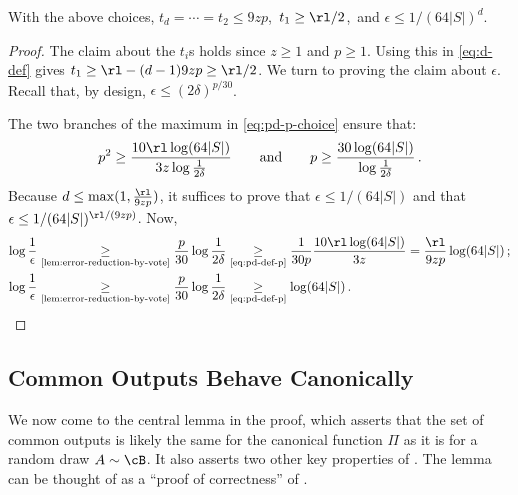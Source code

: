 \begin{itemize}
\begin{itemize}
\begin{lemma}\label{lem:pd-p-properties}
  With the above choices, $t_d = \cdots = t_2 \le 9zp$,\, $t_1 \ge \rl / 2$,\, and
  $\epsilon \le 1 / (64 |S|)^d$.
\end{lemma}
%
\begin{proof}%
  The claim about the $t_i$s holds since $z \ge 1$ and $p \ge 1$. Using this
  in \cref{eq:d-def} gives $t_1 \ge \rl - (d - 1) 9zp \ge \rl / 2$. We turn to
  proving the claim about $\epsilon$. Recall that, by design, $\epsilon \le
  (2\delta)^{p/30}$. 

  The two branches of the maximum in \cref{eq:pd-p-choice} ensure that:
  \begin{align}
    p^2 \ge \frac{10 \rl \log (64|S|)}{3 z \log \frac{1}{2\delta}} \qquad \text{and} \qquad p \ge \frac{30 \log(64|S|)}{\log \frac{1}{2\delta}}\,. \label{eq:pd-def-p}
  \end{align}
  Because $d \le \max(1, \frac{\rl}{9 z p})$, it suffices to prove that
  $\epsilon \le 1 / (64 |S|)$ and that $\epsilon \le 1 / (64 |S|)^{\rl / (9 z
  p)}$. Now,
  \begin{align*}
    \log \frac{1}{\epsilon}
    &\underset{\text{\Cref{lem:error-reduction-by-vote}}}{\ge} \frac{p}{30}
      \log \frac{1}{2\delta} \underset{\text{\cref{eq:pd-def-p}}}{\ge}
      \frac{1}{30 p} \frac{10 \rl \log(64 |S|)}{3z} = \frac{\rl}{9zp}
      \log(64|S|) \,; \\ 
    \log \frac{1}{\epsilon} 
    &\underset{\text{\Cref{lem:error-reduction-by-vote}}}{\ge} \frac{p}{30} 
      \log \frac{1}{2\delta} \underset{\text{\cref{eq:pd-def-p}}}{\ge} \log(64|S|) \,. \qedhere
  \end{align*}
\end{proof}


\subsection{Common Outputs Behave Canonically}

We now come to the central lemma in the proof, which asserts that the set of
common outputs is likely the same for the canonical function $\Pi$ as it is
for a random draw $A \sim \cB$. It also asserts two other key properties of
\fco. The lemma can be thought of as a ``proof of correctness'' of \fco.


\end{itemize}
\end{itemize}
